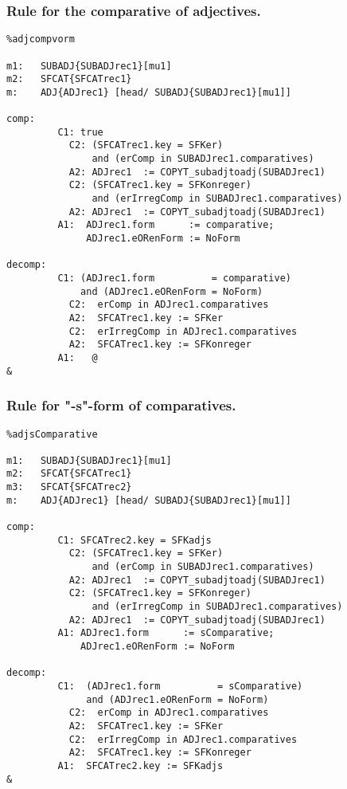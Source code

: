 \subsubsection{Rule for the comparative of adjectives.}
\begin{verbatim}
%adjcompvorm

m1:   SUBADJ{SUBADJrec1}[mu1]
m2:   SFCAT{SFCATrec1}
m:    ADJ{ADJrec1} [head/ SUBADJ{SUBADJrec1}[mu1]]

comp:    
         C1: true
           C2: (SFCATrec1.key = SFKer) 
               and (erComp in SUBADJrec1.comparatives)
           A2: ADJrec1  := COPYT_subadjtoadj(SUBADJrec1)
           C2: (SFCATrec1.key = SFKonreger) 
               and (erIrregComp in SUBADJrec1.comparatives)
           A2: ADJrec1  := COPYT_subadjtoadj(SUBADJrec1)
         A1:  ADJrec1.form      := comparative;
              ADJrec1.eORenForm := NoForm

decomp:  
         C1: (ADJrec1.form          = comparative) 
             and (ADJrec1.eORenForm = NoForm)
           C2:  erComp in ADJrec1.comparatives
           A2:  SFCATrec1.key := SFKer
           C2:  erIrregComp in ADJrec1.comparatives
           A2:  SFCATrec1.key := SFKonreger
         A1:   @
&
\end{verbatim}
\newpage
\subsubsection{Rule for "-s"-form of comparatives.}
\begin{verbatim}
%adjsComparative

m1:   SUBADJ{SUBADJrec1}[mu1]
m2:   SFCAT{SFCATrec1}
m3:   SFCAT{SFCATrec2}
m:    ADJ{ADJrec1} [head/ SUBADJ{SUBADJrec1}[mu1]]

comp:    
         C1: SFCATrec2.key = SFKadjs
           C2: (SFCATrec1.key = SFKer) 
               and (erComp in SUBADJrec1.comparatives)
           A2: ADJrec1  := COPYT_subadjtoadj(SUBADJrec1)
           C2: (SFCATrec1.key = SFKonreger)
               and (erIrregComp in SUBADJrec1.comparatives)
           A2: ADJrec1  := COPYT_subadjtoadj(SUBADJrec1)
         A1: ADJrec1.form      := sComparative;
             ADJrec1.eORenForm := NoForm

decomp:  
         C1:  (ADJrec1.form          = sComparative) 
              and (ADJrec1.eORenForm = NoForm)
           C2:  erComp in ADJrec1.comparatives
           A2:  SFCATrec1.key := SFKer
           C2:  erIrregComp in ADJrec1.comparatives
           A2:  SFCATrec1.key := SFKonreger
         A1:  SFCATrec2.key := SFKadjs
&
\end{verbatim}
\newpage
